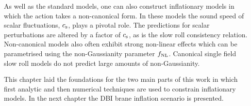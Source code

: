 As well as the standard models, one can also construct inflationary models in which the action
takes a non-canonical form. In these models the sound speed of scalar fluctuations, $c_\mathrm{s}$, plays a
pivotal role. The predictions for scalar perturbations are altered by a factor of $c_\mathrm{s}$, as is the
slow roll consistency relation. Non-canonical models also often exhibit strong non-linear effects
which can be parametrised using the non-Gaussianity parameter $f_{\mathrm{NL}}$. Canonical single field slow
roll models do not predict large amounts of non-Gaussianity. 

This chapter laid the foundations for the two main parts of this work in which first
analytic
and then numerical techniques are used to constrain inflationary models. In the next chapter the
DBI brane inflation scenario is presented. 


